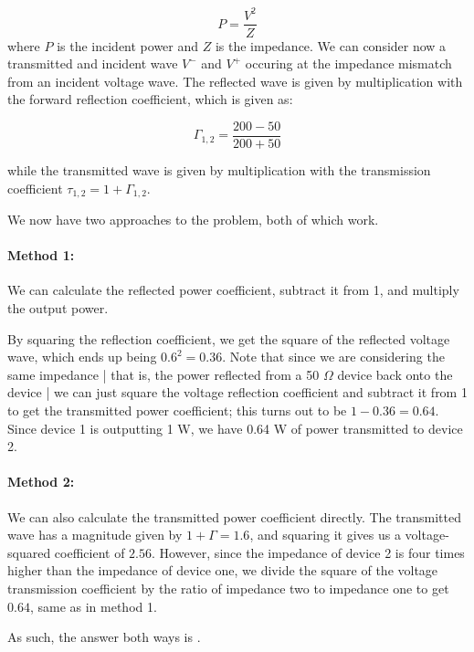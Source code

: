 \documentclass{article}
\begin{document}
\[
P = \frac{V^2}{Z}
\]
where $P$ is the incident power and $Z$ is the impedance. We can consider now a transmitted and incident wave $V^-$ and $V^+$ occuring at the impedance mismatch from an incident voltage wave. The reflected wave is given by multiplication with the forward reflection coefficient, which is given as:

\[
\Gamma_{1,2} = \frac{200 - 50}{200 + 50}
\]

while the transmitted wave is given by multiplication with the transmission coefficient $\tau_{1,2} = 1 + \Gamma_{1,2}$. 

\vspace{3mm}

We now have two approaches to the problem, both of which work. 

\paragraph{Method 1:} We can calculate the reflected power coefficient, subtract it from 1, and multiply the output power. 
\vspace{3mm}

By squaring the reflection coefficient, we get the square of the reflected voltage wave, which ends up being $0.6^2 = 0.36$. Note that since we are considering the same impedance | that is, the power reflected from a 50 $\Omega$ device back onto the device | we can just square the voltage reflection coefficient and subtract it from 1 to get the transmitted power coefficient; this turns out to be $1 - 0.36 = 0.64$. Since device 1 is outputting 1 W, we have 0.64 W of power transmitted to device 2. 

\paragraph{Method 2:} We can also calculate the transmitted power coefficient directly. The transmitted wave has a magnitude given by $1 + \Gamma = 1.6$, and squaring it gives us a voltage-squared coefficient of $2.56$. However, since the impedance of device 2 is four times higher than the impedance of device one, we divide the square of the voltage transmission coefficient by the ratio of impedance two to impedance one to get $0.64$, same as in method 1.

\vspace{3mm}

As such, the answer both ways is .


\vfill
\end{document}
